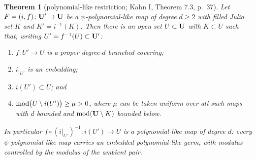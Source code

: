 \documentclass[11pt,reqno]{amsart}
\newtheorem{theorem}{Theorem}[section]
\theoremstyle{definition}
\theoremstyle{remark}
\begin{document}
\begin{theorem}[polynomial-like restriction; Kahn I, Theorem 7.3, p.~37]\label{thm:kahn-psql-restriction}
Let \(F=(i,f)\colon\mathbf{U}'\to\mathbf{U}\) be a \(\psi\)-polynomial-like map of
degree \(d\ge2\) with filled Julia set \(K\) and \(K'=i^{-1}(K)\).
Then there is an open set \(U\subset\mathbf{U}\) with \(K\subset U\) such
that, writing \(U'=f^{-1}(U)\subset\mathbf{U}'\):
\begin{enumerate}
\item \(f\colon U'\to U\) is a proper degree-\(d\) branched covering;
\item \(i|_{U'}\) is an embedding;
\item \(i(U')\subset U\); and
\item \(\operatorname{mod}\bigl(U\setminus i(U')\bigr)\ge\mu>0\), where \(\mu\) can be
taken uniform over all such maps with \(d\) bounded and
\(\operatorname{mod}(\mathbf{U}\setminus K)\) bounded below.
\end{enumerate}
In particular \(f\circ(i|_{U'})^{-1}\colon i(U')\to U\) is a
polynomial-like map of degree \(d\): every \(\psi\)-polynomial-like map
carries an \emph{embedded} polynomial-like germ, with modulus
controlled by the modulus of the ambient pair.
\end{theorem}
\end{document}
